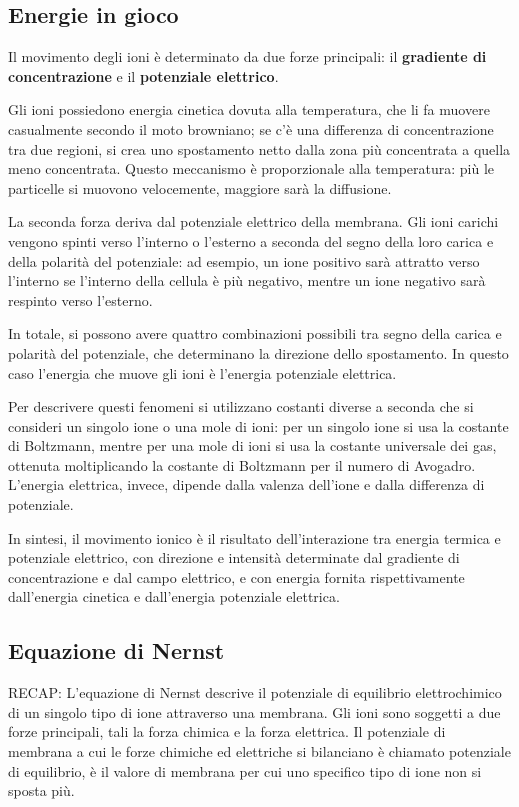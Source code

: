 \documentclass[12pt,a4paper,openany]{book}
\begin{document}
\subsection{Energie in gioco}

Il movimento degli ioni è determinato da due forze principali: il \textbf{gradiente di concentrazione }e il \textbf{potenziale elettrico}.

Gli ioni possiedono energia cinetica dovuta alla temperatura, che li fa muovere casualmente secondo il moto browniano; se c'è una differenza di concentrazione tra due regioni, si crea uno spostamento netto dalla zona più concentrata a quella meno concentrata. Questo meccanismo è proporzionale alla temperatura: più le particelle si muovono velocemente, maggiore sarà la diffusione.

La seconda forza deriva dal potenziale elettrico della membrana. Gli ioni carichi vengono spinti verso l'interno o l'esterno a seconda del segno della loro carica e della polarità del potenziale: ad esempio, un ione positivo sarà attratto verso l'interno se l'interno della cellula è più negativo, mentre un ione negativo sarà respinto verso l'esterno.

In totale, si possono avere quattro combinazioni possibili tra segno della carica e polarità del potenziale, che determinano la direzione dello spostamento. In questo caso l'energia che muove gli ioni è l'energia potenziale elettrica.

Per descrivere questi fenomeni si utilizzano costanti diverse a seconda che si consideri un singolo ione o una mole di ioni: per un singolo ione si usa la costante di Boltzmann, mentre per una mole di ioni si usa la costante universale dei gas, ottenuta moltiplicando la costante di Boltzmann per il numero di Avogadro. L'energia elettrica, invece, dipende dalla valenza dell'ione e dalla differenza di potenziale.

In sintesi, il movimento ionico è il risultato dell'interazione tra energia termica e potenziale elettrico, con direzione e intensità determinate dal gradiente di concentrazione e dal campo elettrico, e con energia fornita rispettivamente dall'energia cinetica e dall'energia potenziale elettrica.


\subsection{Equazione di Nernst}

RECAP: L'equazione di Nernst descrive il potenziale di equilibrio elettrochimico di un singolo tipo di ione attraverso una membrana. Gli ioni sono soggetti a due forze principali, tali la forza chimica e la forza elettrica. Il potenziale di membrana a cui le forze chimiche ed elettriche si bilanciano è chiamato potenziale di equilibrio, è il valore di membrana per cui uno specifico tipo di ione non si sposta più.
\end{document}
